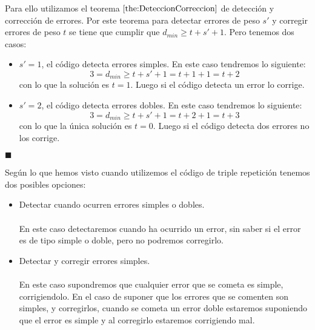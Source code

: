 \begin{itemize}
Para ello utilizamos el teorema $\ref{the:DeteccionCorreccion}$ de
detecci\'on y correcci\'on de errores. Por este teorema para detectar errores
de peso $s'$ y corregir errores de peso $t$ se tiene que cumplir que
$d_{min}\geq t+s'+1$. Pero tenemos dos casos:
\begin{itemize}
\item $s'=1$, el c\'odigo detecta errores simples. En este caso tendremos lo
siguiente:
\begin{displaymath}
3=d_{min}\geq t+s'+1=t+1+1=t+2
\end{displaymath}
con lo que la soluci\'on es $t=1$. Luego si el c\'odigo
detecta un error lo corrige.
\item $s'=2$, el c\'odigo detecta errores dobles. En este caso tendremos lo
siguiente:
\begin{displaymath}
3=d_{min} \geq t+s'+1=t+2+1=t+3
\end{displaymath}
con lo que la \'unica soluci\'on es $t=0$. Luego si el c\'odigo detecta
dos errores no los corrige.
\end{itemize}
\end{itemize}
\begin{flushright}
$\blacksquare$
\end{flushright}

Seg\'un lo que hemos visto cuando utilizemos el c\'odigo de triple repetici\'on 
tenemos dos posibles opciones:
\begin{itemize}
\item Detectar cuando ocurren errores simples o dobles.\\ \\
En este caso detectaremos cuando ha ocurrido un error, sin saber si el error es
de tipo simple o doble, pero no podremos corregirlo.
\item Detectar y corregir errores simples.\\ \\
En este caso supondremos que cualquier error que se cometa es simple,
corrigiendolo. En el caso de suponer que los errores que se comenten son
simples,
y corregirlos, cuando se cometa un error doble estaremos suponiendo que el error
es simple y al corregirlo estaremos corrigiendo mal.
\end{itemize}

